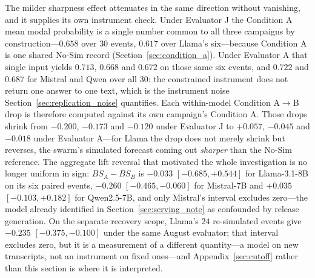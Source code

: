 \documentclass[11pt,journal,onecolumn]{IEEEtran}
\begin{document}
The milder sharpness effect attenuates in the same direction without vanishing, and it supplies its own instrument check. Under Evaluator J the Condition A mean modal probability is a single number common to all three campaigns by construction---$0.658$ over $30$ events, $0.617$ over Llama's six---because Condition A is one shared No-Sim record (Section~\ref{sec:condition_a}). Under Evaluator A that single input yields $0.713$, $0.668$ and $0.672$ on those same six events, and $0.722$ and $0.687$ for Mistral and Qwen over all $30$: the constrained instrument does not return one answer to one text, which is the instrument noise Section~\ref{sec:replication_noise} quantifies. Each within-model Condition A$\to$B drop is therefore computed against its own campaign's Condition A. Those drops shrink from $-0.200$, $-0.173$ and $-0.120$ under Evaluator J to $+0.057$, $-0.045$ and $-0.018$ under Evaluator A---for Llama the drop does not merely shrink but reverses, the swarm's simulated forecast coming out \emph{sharper} than the No-Sim reference. The aggregate lift reversal that motivated the whole investigation is no longer uniform in sign: $BS_A - BS_B$ is $-0.033$ $[-0.685, +0.544]$ for Llama-3.1-8B on its six paired events, $-0.260$ $[-0.465, -0.060]$ for Mistral-7B and $+0.035$ $[-0.103, +0.182]$ for Qwen2.5-7B, and only Mistral's interval excludes zero---the model already identified in Section~\ref{sec:serving_note} as confounded by release generation. On the separate recovery scope, Llama's $24$ re-simulated events give $-0.235$ $[-0.375, -0.100]$ under the same August evaluator; that interval excludes zero, but it is a measurement of a different quantity---a model on new transcripts, not an instrument on fixed ones---and Appendix~\ref{sec:cutoff} rather than this section is where it is interpreted.
\end{document}

